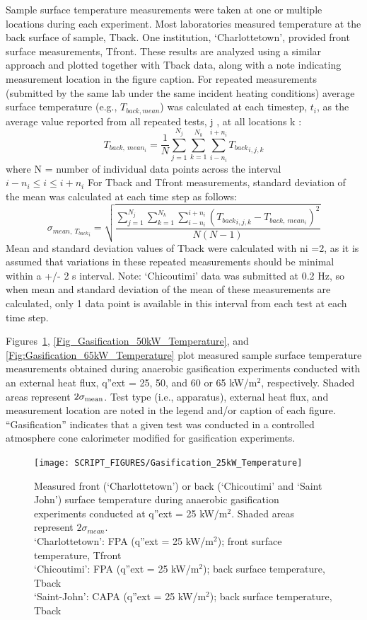 \documentclass{book}
\begin{document}
Sample surface temperature measurements were taken at one or multiple locations during each experiment. Most laboratories measured temperature at the back surface of sample, Tback. One institution, ‘Charlottetown’, provided front surface measurements, Tfront. These results are analyzed using a similar approach and plotted together with Tback data, along with a note indicating measurement location in the figure caption. For repeated measurements (submitted by the same lab under the same incident heating conditions) average surface temperature (e.g., $T_{back,mean}$) was calculated at each timestep, $t_i$, as the average value reported from all repeated tests, j , at all locations k :
\begin{equation}
   T_{back,\ mean_i}=\frac{1}{N}\sum_{j=1}^{N_j}\sum_{k=1}^{N_k}\sum_{i-n_i}^{i+n_i}{T_{back}}_{i,j,k}
\end{equation}
where N = number of individual data points across the interval $i-n_i\le i\le i+n_i$
For Tback and Tfront measurements, standard deviation of the mean was calculated at each time step as follows:
\begin{equation}
   \sigma_{mean,\ {T_{back}}_i}=\sqrt{\frac{\sum_{j=1}^{N_j}\sum_{k=1}^{N_k}\sum_{i-n_i}^{i+n_i}\left({T_{back}}_{i,j,k}-T_{back,\ mean_i}\right)^2}{N\left(N-1\right)}}
\end{equation}
Mean and standard deviation values of Tback were calculated with ni =2, as it is assumed that variations in these repeated measurements should be minimal within a +/- 2 s interval. Note: ‘Chicoutimi’ data was submitted at 0.2 Hz, so when mean and standard deviation of the mean of these measurements are calculated, only 1 data point is available in this interval from each test at each time step.

Figures~\ref{Fig:Gasification_25kW_Temperature}, \ref{Fig_Gasification_50kW_Temperature}, and \ref{Fig:Gasification_65kW_Temperature} plot measured sample surface temperature measurements obtained during anaerobic gasification experiments conducted with an external heat flux, q”ext =  25, 50, and 60 or 65 kW/m$^2$, respectively. Shaded areas represent $2\sigma_{\rm mean}$. Test type (i.e., apparatus), external heat flux, and measurement location are noted in the legend and/or caption of each figure. ``Gasification'' indicates that a given test was conducted in a controlled atmosphere cone calorimeter modified for gasification experiments.

\begin{figure}
  \centering
  \texttt{[image: SCRIPT\_FIGURES/Gasification\_25kW\_Temperature]}
  \caption{Measured front (‘Charlottetown’) or back (‘Chicoutimi’ and ‘Saint John’) surface temperature during anaerobic gasification experiments conducted at q”ext = 25 kW/m$^2$. Shaded areas represent $2\sigma_{mean}$. \\
‘Charlottetown’:  FPA (q”ext = 25 kW/m$^2$); front surface temperature, Tfront \\
‘Chicoutimi’:   FPA (q”ext = 25 kW/m$^2$); back surface temperature, Tback \\
‘Saint-John’:   CAPA (q”ext = 25 kW/m$^2$); back surface temperature, Tback}
  \label{Fig:Gasification_25kW_Temperature}
\end{figure}
\end{document}
